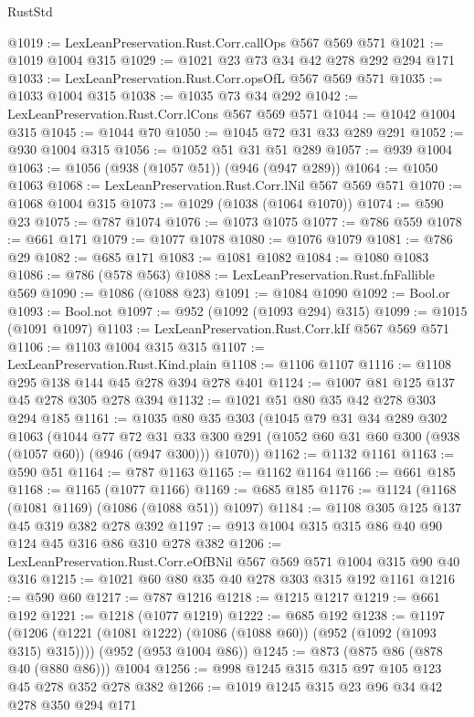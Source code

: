 \begin{lexlean}{RustStd}
\begin{coremodule}
@1019 := LexLeanPreservation.Rust.Corr.callOps @567 @569 @571
@1021 := @1019 @1004 @315
@1029 := @1021 @23 @73 @34 @42 @278 @292 @294 @171
@1033 := LexLeanPreservation.Rust.Corr.opsOfL @567 @569 @571
@1035 := @1033 @1004 @315
@1038 := @1035 @73 @34 @292
@1042 := LexLeanPreservation.Rust.Corr.lCons @567 @569 @571
@1044 := @1042 @1004 @315
@1045 := @1044 @70
@1050 := @1045 @72 @31 @33 @289 @291
@1052 := @930 @1004 @315
@1056 := @1052 @51 @31 @51 @289
@1057 := @939 @1004
@1063 := @1056 (@938 (@1057 @51)) (@946 (@947 @289))
@1064 := @1050 @1063
@1068 := LexLeanPreservation.Rust.Corr.lNil @567 @569 @571
@1070 := @1068 @1004 @315
@1073 := @1029 (@1038 (@1064 @1070))
@1074 := @590 @23
@1075 := @787 @1074
@1076 := @1073 @1075
@1077 := @786 @559
@1078 := @661 @171
@1079 := @1077 @1078
@1080 := @1076 @1079
@1081 := @786 @29
@1082 := @685 @171
@1083 := @1081 @1082
@1084 := @1080 @1083
@1086 := @786 (@578 @563)
@1088 := LexLeanPreservation.Rust.fnFallible @569
@1090 := @1086 (@1088 @23)
@1091 := @1084 @1090
@1092 := Bool.or
@1093 := Bool.not
@1097 := @952 (@1092 (@1093 @294) @315)
@1099 := @1015 (@1091 @1097)
@1103 := LexLeanPreservation.Rust.Corr.kIf @567 @569 @571
@1106 := @1103 @1004 @315 @315
@1107 := LexLeanPreservation.Rust.Kind.plain
@1108 := @1106 @1107
@1116 := @1108 @295 @138 @144 @45 @278 @394 @278 @401
@1124 := @1007 @81 @125 @137 @45 @278 @305 @278 @394
@1132 := @1021 @51 @80 @35 @42 @278 @303 @294 @185
@1161 := @1035
    @80
    @35
    @303
    (@1045
      @79
      @31
      @34
      @289
      @302
      @1063
      (@1044
        @77
        @72
        @31
        @33
        @300
        @291
        (@1052 @60 @31 @60 @300 (@938 (@1057 @60)) (@946 (@947 @300)))
        @1070))
@1162 := @1132 @1161
@1163 := @590 @51
@1164 := @787 @1163
@1165 := @1162 @1164
@1166 := @661 @185
@1168 := @1165 (@1077 @1166)
@1169 := @685 @185
@1176 := @1124 (@1168 (@1081 @1169) (@1086 (@1088 @51)) @1097)
@1184 := @1108 @305 @125 @137 @45 @319 @382 @278 @392
@1197 := @913 @1004 @315 @315 @86 @40 @90 @124 @45 @316 @86 @310 @278 @382
@1206 := LexLeanPreservation.Rust.Corr.eOfBNil @567 @569 @571 @1004 @315 @90 @40 @316
@1215 := @1021 @60 @80 @35 @40 @278 @303 @315 @192 @1161
@1216 := @590 @60
@1217 := @787 @1216
@1218 := @1215 @1217
@1219 := @661 @192
@1221 := @1218 (@1077 @1219)
@1222 := @685 @192
@1238 := @1197
    (@1206 (@1221 (@1081 @1222) (@1086 (@1088 @60)) (@952 (@1092 (@1093 @315) @315))))
    (@952 (@953 @1004 @86))
@1245 := @873 (@875 @86 (@878 @40 (@880 @86))) @1004
@1256 := @998 @1245 @315 @315 @97 @105 @123 @45 @278 @352 @278 @382
@1266 := @1019 @1245 @315 @23 @96 @34 @42 @278 @350 @294 @171

\end{coremodule}
\end{lexlean}
